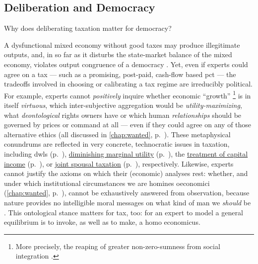 
\subsection{Deliberation and Democracy}
Why does deliberating taxation matter for democracy?

A dysfunctional mixed economy without good taxes may produce illegitimate outputs, and, in so far as it disturbs the state-market balance of the mixed economy, violates output congruence of a democracy \citep[compare][190]{Zurn-2000-aa}.
Yet, even if experts could agree on a tax --- such as a promising, post-paid, cash-flow based \gls{pct} --- the tradeoffs involved in choosing or calibrating a tax regime are irreducibly political.
For example, experts cannot \emph{positively} inquire whether economic ``growth''
\footnote{
	More precisely, the reaping of greater non-zero-sumness from social integration \citep{Wright2000}.
}
is in itself \emph{virtuous}, which inter-subjective aggregation would be \emph{utility-maximizing}, what \emph{deontological} rights owners have or which human \emph{relationships} should be governed by prices or command at all --- even if they could agree on any of those alternative ethics (all discussed in \autoref{chap:wanted}, p.~\pageref{chap:wanted}).
These metaphysical conundrums are reflected in very concrete, technocratic issues in taxation, including \glspl{dwl} (p.~\pageref{sec:tax-optimality}), \hyperref[sec:diminishing-marginal-utility]{diminishing marginal utility} (p.~\pageref{sec:diminishing-marginal-utility}), the \hyperref[des:structural-agnosticism]{treatment of capital income} (p.~\pageref{des:structural-agnosticism}), or \hyperref[sec:love-marriage]{joint spousal taxation} (p.~\pageref{sec:love-marriage}), respectively.
Likewise, experts cannot justify the axioms on which their (economic) analyses rest:
whether, and under which institutional circumstances we are homines oeconomici (\autoref{chap:wanted}, p.~\pageref{chap:wanted}), cannot be exhaustively answered from observation, because nature provides no intelligible moral messages on what kind of man we \emph{should} be \citep[43]{Gould1982}.
This ontological stance matters for tax, too:
for an expert to model a general equilibrium is to invoke, as well as to make, a homo economicus.

